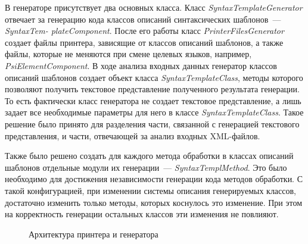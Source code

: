В генераторе присутствует два основных класса. Класс \textit{SyntaxTemplateGenerator} отвечает за генерацию кода классов описаний синтаксических шаблонов~---  \textit{SyntaxTem- plateComponent}. После его работы класс \textit{PrinterFilesGenerator} создает файлы принтера, зависящие от классов описаний шаблонов, а также файлы, которые не меняются при смене целевых языков, например, \textit{PsiElementComponent}. В ходе анализа входных данных генератор классов описаний шаблонов создает объект класса \textit{SyntaxTemplateClass}, методы которого позволяют получить текстовое представление полученного результата генерации. То есть фактически класс генератора не создает текстовое представление, а лишь задает все необходимые параметры для него в классе \textit{SyntaxTemplateClass}. Такое решение было принято для разделения части, связанной с генерацией текстового представления, и части, отвечающей за анализ входных XML-файлов.

Также было решено создать для каждого метода обработки в классах описаний шаблонов отдельные модули их генерации~--- \textit{SyntaxTemplMethod}. Это было необходимо для достижения независимости генерации кода методов обработки. С такой конфигурацией, при изменении системы описания генерируемых классов, достаточно изменить только методы, которых коснулось это изменение. При этом на корректность генерации остальных классов эти изменения не повлияют.

\begin{figure}[h]
\caption{Архитектура принтера и генератора}
\label{fig:Architecture}
\end{figure}

